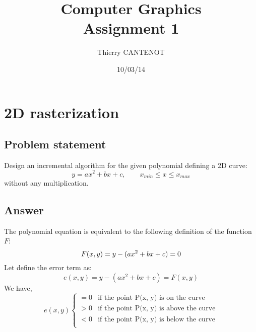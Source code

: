 \documentclass[a4paper,10pt]{article}
\title{\textbf{Computer Graphics} \\ Assignment 1}
\author{Thierry CANTENOT}
\date{10/03/14}
\begin{document}
\maketitle

\section{2D rasterization}
\subsection{Problem statement}

Design an incremental algorithm for the given polynomial defining a 2D curve:
\begin{equation}
	y = ax^2 + bx + c, \qquad x_{min} \le x \le x_{max}
\end{equation}
without any multiplication.

\bigskip
\subsection{Answer}

The polynomial equation is equivalent to the following definition of the function $F$:
\begin{equation}
	F(x, y) = y - (ax^2 + bx + c) = 0 \\\\
\end{equation}
Let define the error term as:
\begin{equation}
	e(x, y) = y - (ax^2 + bx + c) = F(x, y)
\end{equation}
We have,
\begin{equation}
	e(x, y) 
	\begin{cases}
	 = 0 & \text{if the point P(x, y) is on the curve} \\
	 > 0 & \text{if the point P(x, y) is above the curve} \\
	 < 0 & \text{if the point P(x, y) is below the curve} \\
	\end{cases}
\end{equation}
\end{document}
